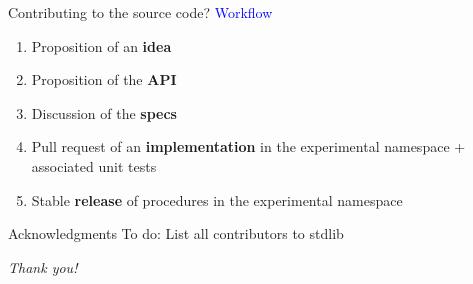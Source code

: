 \documentclass{beamer}
\begin{document}
\begin{frame}[c]{Contributing to the source code?}
	\textcolor{blue}{Workflow}
	\begin{enumerate}
		\item Proposition of an \textbf{idea}
		\item Proposition of the \textbf{API}
		\item Discussion of the \textbf{specs}
		\item Pull request of an \textbf{implementation} in the experimental namespace + associated unit tests
		\item Stable \textbf{release} of procedures in the experimental namespace
	\end{enumerate}
\end{frame}


\begin{frame}[c]{Acknowledgments}
	To do: List all contributors to stdlib
\end{frame}

\begin{frame}[c]{}
	\centering \Huge
	\emph{Thank you!}
\end{frame}
\end{document}
